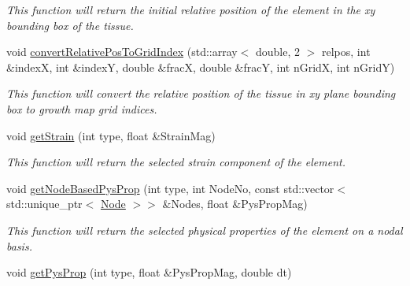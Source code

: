 \begin{DoxyCompactItemize}
\begin{DoxyCompactList}\small\item\em This function will return the initial relative position of the element in the xy bounding box of the tissue. \end{DoxyCompactList}\item 
\hypertarget{classShapeBase_acde567878e8335d5f3b82042bcf23e5b}{}void \hyperlink{classShapeBase_acde567878e8335d5f3b82042bcf23e5b}{convert\+Relative\+Pos\+To\+Grid\+Index} (std\+::array$<$ double, 2 $>$ relpos, int \&index\+X, int \&index\+Y, double \&frac\+X, double \&frac\+Y, int n\+Grid\+X, int n\+Grid\+Y)\label{classShapeBase_acde567878e8335d5f3b82042bcf23e5b}

\begin{DoxyCompactList}\small\item\em This function will convert the relative position of the tissue in xy plane bounding box to growth map grid indices. \end{DoxyCompactList}\item 
\hypertarget{classShapeBase_aecf99016ea7c36e0bff43a40e6a89df3}{}void \hyperlink{classShapeBase_aecf99016ea7c36e0bff43a40e6a89df3}{get\+Strain} (int type, float \&Strain\+Mag)\label{classShapeBase_aecf99016ea7c36e0bff43a40e6a89df3}

\begin{DoxyCompactList}\small\item\em This function will return the selected strain component of the element. \end{DoxyCompactList}\item 
\hypertarget{classShapeBase_a6971273ad49bfe9a49b2ddf09e426291}{}void \hyperlink{classShapeBase_a6971273ad49bfe9a49b2ddf09e426291}{get\+Node\+Based\+Pys\+Prop} (int type, int Node\+No, const std\+::vector$<$ std\+::unique\+\_\+ptr$<$ \hyperlink{classNode}{Node} $>$$>$ \&Nodes, float \&Pys\+Prop\+Mag)\label{classShapeBase_a6971273ad49bfe9a49b2ddf09e426291}

\begin{DoxyCompactList}\small\item\em This function will return the selected physical properties of the element on a nodal basis. \end{DoxyCompactList}\item 
\hypertarget{classShapeBase_abff91451c3465778ed89624d6196f7f6}{}void \hyperlink{classShapeBase_abff91451c3465778ed89624d6196f7f6}{get\+Pys\+Prop} (int type, float \&Pys\+Prop\+Mag, double dt)\label{classShapeBase_abff91451c3465778ed89624d6196f7f6}


\end{DoxyCompactItemize}
